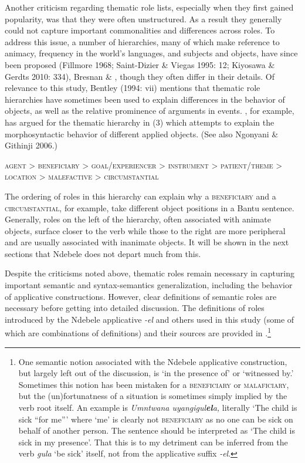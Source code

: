 \documentclass[output=paper]{langsci/langscibook}
\begin{document}
Another criticism regarding thematic role lists, especially when they first gained popularity, was that they were often unstructured. As a result they generally could not capture important commonalities and differences across roles. To address this issue, a number of hierarchies, many of which make reference to animacy, frequency in the world’s languages, and subjects and objects, have since been proposed (Fillmore 1968; Saint-Dizier \& Viegas 1995: 12; Kiyosawa \& Gerdts 2010: 334), Bresnan \& \citet{Kanerva1989}, though they often differ in their details. Of relevance to this study, Bentley (1994: vii) mentions that thematic role hierarchies have sometimes been used to explain differences in the behavior of objects, as well as the relative prominence of arguments in events. \citet[129]{Mchombo2004}, for example, has argued for the thematic hierarchy in (3) which attempts to explain the morphosyntactic behavior of different applied objects. (See also Ngonyani \& Githinji 2006.)

\ea
\textsc{agent > beneficiary > goal/experiencer > instrument > patient/theme > location > malefactive > circumstantial}\\
\z

The ordering of roles in this hierarchy can explain why a \textsc{beneficiary} and a \textsc{circumstantial}, for example, take different object positions in a Bantu sentence. Generally, roles on the left of the hierarchy, often associated with animate objects, surface closer to the verb while those to the right are more peripheral and are usually associated with inanimate objects. It will be shown in the next sections that Ndebele does not depart much from this.

 Despite the criticisms noted above, thematic roles remain necessary in capturing important semantic and syntax-semantics generalization, including the behavior of applicative constructions. However, clear definitions of semantic roles are necessary before getting into detailed discussion. The definitions of roles introduced by the Ndebele applicative \textit{-el} and others used in this study (some of which are combinations of definitions) and their sources are provided in .\footnote {One semantic notion associated with the Ndebele applicative construction, but largely left out of the discussion, is ‘in the presence of’ or ‘witnessed by.’ Sometimes this notion has been mistaken for a \textsc{beneficiary} or \textsc{malaficiary}, but the (un)fortunatness of a situation is sometimes simply implied by the verb root itself. An example is \textit{Umntwana uyangigul}\textbf{\textit{el}}\textit{a,} literally ‘The child is sick “for me”’ where ‘me’ is clearly not \textsc{beneficiary} as no one can be sick on behalf of another person. The sentence should be interpreted as ‘The child is sick in my presence’. That this is to my detriment can be inferred from the verb \textit{gula} ‘be sick’ itself, not from the applicative suffix \textit{-el}.} 
\end{document}
